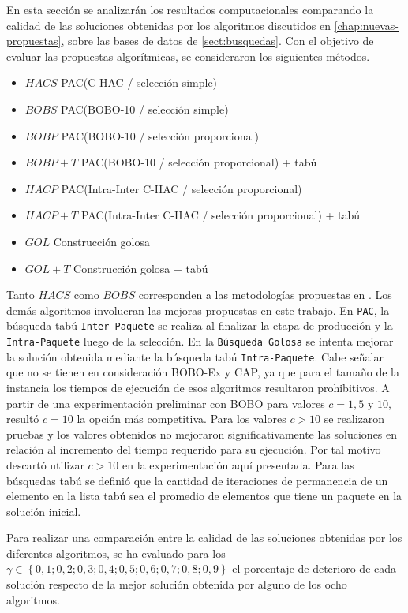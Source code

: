 En esta sección se analizarán los resultados computacionales comparando la calidad de las soluciones obtenidas por los algoritmos discutidos en \autoref{chap:nuevas-propuestas}, sobre las bases de datos de \autoref{sect:busquedas}. Con el objetivo de evaluar las propuestas algorítmicas, se consideraron los siguientes métodos.

\begin{itemize}
\item{$HACS$} PAC(C-HAC / selección simple)
\item{$BOBS$} PAC(BOBO-10 / selección simple)
\item{$BOBP$} PAC(BOBO-10 / selección proporcional)
\item{$BOBP+T$} PAC(BOBO-10 / selección proporcional) + tabú
\item{$HACP$} PAC(Intra-Inter C-HAC / selección proporcional)
\item{$HACP+T$} PAC(Intra-Inter C-HAC / selección proporcional) + tabú
\item{$GOL$} Construcción golosa
\item{$GOL+T$} Construcción golosa + tabú
\end{itemize}

Tanto $HACS$ como $BOBS$ corresponden a las metodologías propuestas en \cite{journals/tkde/Amer-YahiaBCFMZ14}. Los demás algoritmos involucran las mejoras propuestas en este trabajo. En \texttt{PAC}, la búsqueda tabú \texttt{Inter-Paquete} se realiza al finalizar la etapa de producción y la \texttt{Intra-Paquete} luego de la selección. En la \texttt{Búsqueda Golosa} se intenta mejorar la solución obtenida mediante la búsqueda tabú \texttt{Intra-Paquete}. Cabe señalar que no se tienen en consideración BOBO-Ex y CAP, ya que para el tamaño de la instancia los tiempos de ejecución de esos algoritmos resultaron prohibitivos. A partir de una experimentación preliminar con BOBO para valores $c=1, 5$ y $10$, resultó $c=10$ la opción más competitiva. Para los valores $c>10$ se realizaron pruebas y los valores obtenidos no mejoraron significativamente las soluciones en relación al incremento del tiempo requerido para su ejecución. Por tal motivo descartó utilizar $c>10$  en la experimentación aquí presentada. Para las búsquedas tabú se definió que la cantidad de iteraciones de permanencia de un elemento en la lista tabú sea el promedio de elementos que tiene un paquete en la solución inicial.

Para realizar una comparación entre la calidad de las soluciones obtenidas por los diferentes algoritmos, se ha evaluado para los $\gamma \in \left\{0,1; 0,2; 0,3; 0,4; 0,5; 0,6; 0,7; 0,8; 0,9\right\}$ el porcentaje de deterioro de cada solución respecto de la mejor solución obtenida por alguno de los ocho algoritmos.

